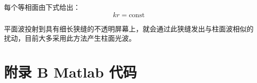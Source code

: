 \documentclass[UTF8]{report}
\theoremstyle{MyLineTheoremStyle} %
\theoremstyle{MyBlockTheoremStyle} %
\theoremstyle{MySubsubsectionStyle} %
\begin{document}
每个等相面由下式给出：
\begin{equation}
    kr = \text{const}
\end{equation}

平面波投射到具有细长狭缝的不透明屏幕上，就会通过此狭缝发出与柱面波相似的扰动，目前大多采用此方法产生柱面光波。






\chapter*{附录 B\hspace*{20pt}  Matlab 代码}   
\thispagestyle{fancy} 
\setcounter{section}{0}   
\renewcommand\thesection{B.\arabic{section}}   
\renewcommand{\thefigure}{B.\arabic{figure}} 
\renewcommand{\thetable}{B.\arabic{table}}
\end{document}
